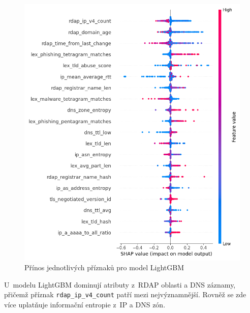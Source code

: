 \begin{figure}[!ht]
    \centering
    \includegraphics[width=1.0\textwidth]{obrazky-figures/shap_Lgbm.png}
    \caption{Přínos jednotlivých příznaků pro model LightGBM}
    \label{fig:shap_Lgbm}
\end{figure}

U~modelu LightGBM dominují atributy z~RDAP oblasti a DNS záznamy, přičemž příznak \texttt{rdap\_ip\_v4\_count} patří mezi nejvýznamnější. Rovněž se zde více uplatňuje informační entropie z~IP a DNS zón.


